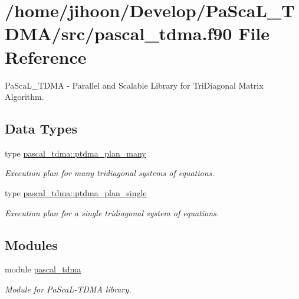 \hypertarget{pascal__tdma_8f90}{}\section{/home/jihoon/\+Develop/\+Pa\+Sca\+L\+\_\+\+T\+D\+M\+A/src/pascal\+\_\+tdma.f90 File Reference}
\label{pascal__tdma_8f90}


Pa\+Sca\+L\+\_\+\+T\+D\+MA -\/ Parallel and Scalable Library for Tri\+Diagonal Matrix Algorithm.  


\subsection*{Data Types}
\begin{DoxyCompactItemize}
\item 
type \hyperlink{structpascal__tdma_1_1ptdma__plan__many}{pascal\+\_\+tdma\+::ptdma\+\_\+plan\+\_\+many}
\begin{DoxyCompactList}\small\item\em Execution plan for many tridiagonal systems of equations. \end{DoxyCompactList}\item 
type \hyperlink{structpascal__tdma_1_1ptdma__plan__single}{pascal\+\_\+tdma\+::ptdma\+\_\+plan\+\_\+single}
\begin{DoxyCompactList}\small\item\em Execution plan for a single tridiagonal system of equations. \end{DoxyCompactList}\end{DoxyCompactItemize}
\subsection*{Modules}
\begin{DoxyCompactItemize}
\item 
module \hyperlink{namespacepascal__tdma}{pascal\+\_\+tdma}
\begin{DoxyCompactList}\small\item\em Module for Pa\+Sca\+L-\/\+T\+D\+MA library. \end{DoxyCompactList}\end{DoxyCompactItemize}
